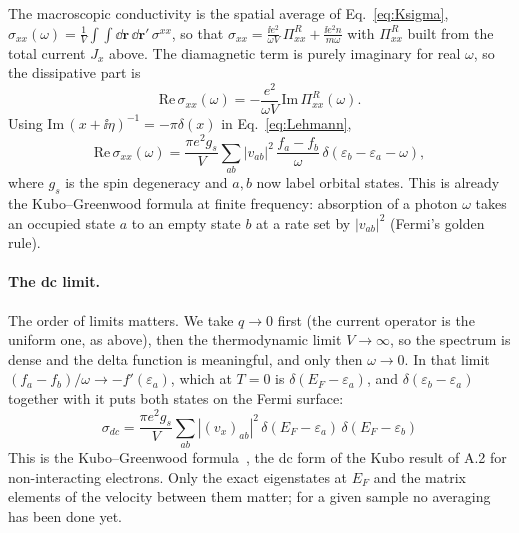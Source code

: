 The macroscopic conductivity is the spatial average of Eq.~\eqref{eq:Ksigma}, $\sigma_{xx}(\omega)=\frac1V\int\!\!\int\dd\mathbf r\,\dd\mathbf r'\,\sigma^{xx}$, so that $\sigma_{xx}=\frac{\ii e^2}{\omega V}\,\Pi^R_{xx}+\frac{\ii e^2n}{m\omega}$ with $\Pi^R_{xx}$ built from the total current $J_x$ above. The diamagnetic term is purely imaginary for real $\omega$, so the dissipative part is
\begin{equation}
\mathrm{Re}\,\sigma_{xx}(\omega)=-\frac{e^2}{\omega V}\,\mathrm{Im}\,\Pi^R_{xx}(\omega).
\end{equation}
Using $\mathrm{Im}\,(x+\ii\eta)^{-1}=-\pi\delta(x)$ in Eq.~\eqref{eq:Lehmann},
\begin{equation}
\mathrm{Re}\,\sigma_{xx}(\omega)=\frac{\pi e^2g_s}{V}\sum_{ab}|v_{ab}|^2\,\frac{f_a-f_b}{\omega}\,\delta(\varepsilon_b-\varepsilon_a-\omega),
\end{equation}
where $g_s$ is the spin degeneracy and $a,b$ now label orbital states. This is already the Kubo--Greenwood formula at finite frequency: absorption of a photon $\omega$ takes an occupied state $a$ to an empty state $b$ at a rate set by $|v_{ab}|^2$ (Fermi's golden rule).

\paragraph{The dc limit.} The order of limits matters. We take $q\to0$ first (the current operator is the uniform one, as above), then the thermodynamic limit $V\to\infty$, so the spectrum is dense and the delta function is meaningful, and only then $\omega\to0$. In that limit $(f_a-f_b)/\omega\to-f'(\varepsilon_a)$, which at $T=0$ is $\delta(E_F-\varepsilon_a)$, and $\delta(\varepsilon_b-\varepsilon_a)$ together with it puts both states on the Fermi surface:
\begin{equation}
\boxed{\sigma_{dc}=\frac{\pi e^2g_s}{V}\sum_{ab}|(v_x)_{ab}|^2\,\delta(E_F-\varepsilon_a)\,\delta(E_F-\varepsilon_b)}
\label{eq:KG}
\end{equation}
This is the Kubo--Greenwood formula~\cite{Greenwood1958}, the dc form of the Kubo result of A.2 for non-interacting electrons. Only the exact eigenstates at $E_F$ and the matrix elements of the velocity between them matter; for a given sample no averaging has been done yet.